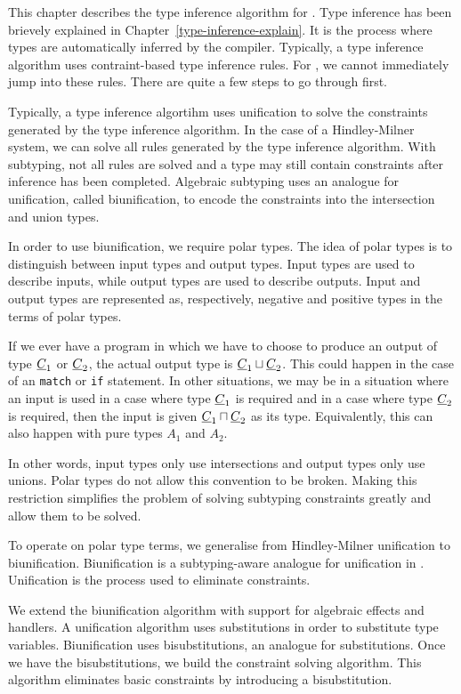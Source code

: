 This chapter describes the type inference algorithm for \core. Type inference has been brievely explained in Chapter~\ref{type-inference-explain}. It is the process where types are automatically inferred by the compiler. Typically, a type inference algorithm uses contraint-based type inference rules. For \core, we cannot immediately jump into these rules. There are quite a few steps to go through first. 

Typically, a type inference algortihm uses unification to solve the constraints generated by the type inference algorithm. In the case of a Hindley-Milner system, we can solve all rules generated by the type inference algorithm. With subtyping, not all rules are solved and a type may still contain constraints after inference has been completed. Algebraic subtyping uses an analogue for unification, called biunification, to encode the constraints into the intersection and union types.

In order to use biunification, we require polar types. The idea of polar types is to distinguish between input types and output types. Input types are used to describe inputs, while output types are used to describe outputs. Input and output types are represented as, respectively, negative and positive types in the terms of polar types. 

If we ever have a program in which we have to choose to produce an output of type $\underline{C}_1$ or $\underline{C}_2$, the actual output type is $\underline{C}_1 \sqcup \underline{C}_2$. This could happen in the case of an \texttt{match} or \texttt{if} statement. In other situations, we may be in a situation where an input is used in a case where type $\underline{C}_1$ is required and in a case where type $\underline{C}_2$ is required, then the input is given $\underline{C}_1 \sqcap \underline{C}_2$ as its type. Equivalently, this can also happen with pure types $A_1$ and $A_2$.  

In other words, input types only use intersections and output types only use unions. Polar types do not allow this convention to be broken. Making this restriction simplifies the problem of solving subtyping constraints greatly and allow them to be solved. \cite{dolan2017algebraic, pottier1998type} 

To operate on polar type terms, we generalise from Hindley-Milner unification to biunification. Biunification is a subtyping-aware analogue for unification in \core. Unification is the process used to eliminate constraints. 

We extend the biunification algorithm with support for algebraic effects and handlers. A unification algorithm uses substitutions in order to substitute type variables. Biunification uses bisubstitutions, an analogue for substitutions. Once we have the bisubstitutions, we build the constraint solving algorithm. This algorithm eliminates basic constraints by introducing a bisubstitution. 

